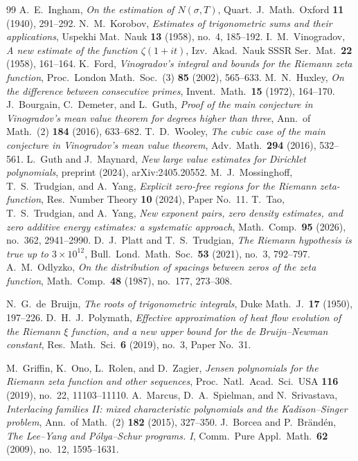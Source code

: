 \documentclass[11pt]{amsart}
\theoremstyle{definition}
\theoremstyle{remark}
\theoremstyle{definition}
\begin{document}
\begin{thebibliography}{99}
 A.~E.~Ingham, \emph{On the estimation of $N(\sigma,T)$}, Quart.\ J.\ Math.\ Oxford
\textbf{11} (1940), 291--292.
 N.~M.~Korobov, \emph{Estimates of trigonometric sums and their applications}, Uspekhi
Mat.\ Nauk \textbf{13} (1958), no.~4, 185--192.
 I.~M.~Vinogradov, \emph{A new estimate of the function $\zeta(1+it)$},
Izv.\ Akad.\ Nauk SSSR Ser.\ Mat.\ \textbf{22} (1958), 161--164.
 K.~Ford, \emph{Vinogradov's integral and bounds for the Riemann zeta function},
Proc.\ London Math.\ Soc.\ (3) \textbf{85} (2002), 565--633.
 M.~N.~Huxley, \emph{On the difference between consecutive primes}, Invent.\ Math.\
\textbf{15} (1972), 164--170.
 J.~Bourgain, C.~Demeter, and L.~Guth, \emph{Proof of the main conjecture in
Vinogradov's mean value theorem for degrees higher than three}, Ann.\ of Math.\ (2) \textbf{184} (2016),
633--682.
 T.~D.~Wooley, \emph{The cubic case of the main conjecture in Vinogradov's mean value
theorem}, Adv.\ Math.\ \textbf{294} (2016), 532--561.
 L.~Guth and J.~Maynard, \emph{New large value estimates for Dirichlet polynomials},
preprint (2024), arXiv:2405.20552.
 M.~J.~Mossinghoff, T.~S.~Trudgian, and A.~Yang, \emph{Explicit zero-free regions for the
Riemann zeta-function}, Res.\ Number Theory \textbf{10} (2024), Paper No.~11.
\bibitem{TTY} T.~Tao, T.~S.~Trudgian, and A.~Yang, \emph{New exponent pairs, zero density estimates, and
zero additive energy estimates: a systematic approach}, Math.\ Comp.\ \textbf{95} (2026), no.~362,
2941--2990.
 D.~J.~Platt and T.~S.~Trudgian, \emph{The Riemann hypothesis is true up to
$3\times10^{12}$}, Bull.\ Lond.\ Math.\ Soc.\ \textbf{53} (2021), no.~3, 792--797.
\bibitem{Odlyzko} A.~M.~Odlyzko, \emph{On the distribution of spacings between zeros of the zeta
function}, Math.\ Comp.\ \textbf{48} (1987), no.~177, 273--308.

 N.~G.~de~Bruijn, \emph{The roots of trigonometric integrals}, Duke Math.\ J.\
\textbf{17} (1950), 197--226.
\bibitem{PolymathDBN} D.~H.~J.~Polymath, \emph{Effective approximation of heat flow evolution of the
Riemann $\xi$ function, and a new upper bound for the de Bruijn--Newman constant}, Res.\ Math.\ Sci.\
\textbf{6} (2019), no.~3, Paper No.~31.

\bibitem{GORZ} M.~Griffin, K.~Ono, L.~Rolen, and D.~Zagier, \emph{Jensen polynomials for the Riemann zeta
function and other sequences}, Proc.\ Natl.\ Acad.\ Sci.\ USA \textbf{116} (2019), no.~22, 11103--11110.
\bibitem{MSS} A.~Marcus, D.~A.~Spielman, and N.~Srivastava, \emph{Interlacing families II: mixed
characteristic polynomials and the Kadison--Singer problem}, Ann.\ of Math.\ (2) \textbf{182} (2015),
327--350.
\bibitem{BorceaBranden} J.~Borcea and P.~Br\"and\'en, \emph{The Lee--Yang and P\'olya--Schur programs.
I}, Comm.\ Pure Appl.\ Math.\ \textbf{62} (2009), no.~12, 1595--1631.


\end{thebibliography}
\end{document}

